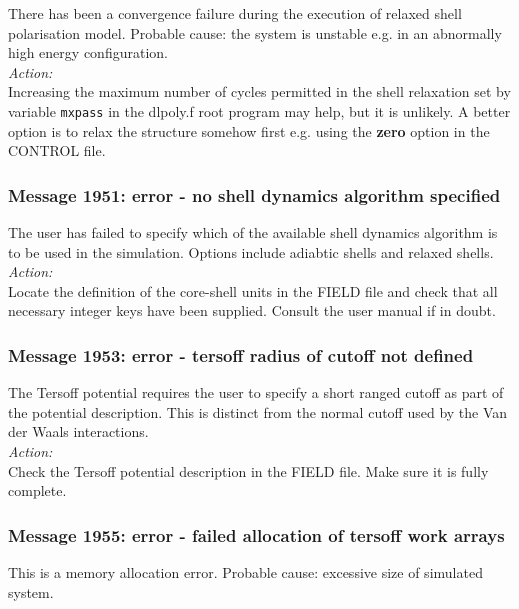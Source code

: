 There has been a convergence failure during the execution of relaxed
shell polarisation model. Probable cause: the system is unstable
e.g. in an abnormally high energy configuration.
\\
\noindent
{\em Action:} \\ Increasing the maximum number of cycles permitted in
the shell relaxation set by variable {\tt mxpass} in the dlpoly.f root
program may help, but it is unlikely. A better option is to relax the
structure somehow first e.g. using the {\bf zero} option in the
CONTROL file.
\\

\subsubsection*{Message 1951: error - no shell dynamics algorithm specified}

The user has failed to specify which of the available shell dynamics
algorithm is to be used in the simulation. Options include adiabtic
shells and relaxed shells.
\\
\noindent
{\em Action:} \\ 
Locate the definition of the core-shell units in the FIELD file and
check that all necessary integer keys have been supplied. Consult the
user manual if in doubt.
\\

\subsubsection*{Message 1953: error - tersoff radius of cutoff not
defined}

The Tersoff potential requires the user to specify a short ranged
cutoff as part of the potential description. This is distinct from the
normal cutoff used by the Van der Waals interactions.
\\
\noindent
{\em Action:} \\
Check the Tersoff potential description in the FIELD file. Make sure
it is fully complete.
\\

\subsubsection*{Message 1955: error - failed allocation of tersoff
work arrays}

This is a memory allocation error. Probable cause: excessive size of
simulated system. \\

